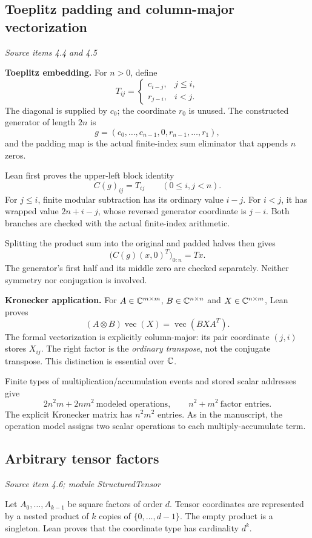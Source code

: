 \subsection{Toeplitz padding and column-major vectorization}\label{supp4:subsection:002}\textit{Source items 4.4 and 4.5}\par
\textbf{Toeplitz embedding.} For $n>0$, define
\[
T_{ij}=
\begin{cases}
c_{i-j},&j\le i,\\
r_{j-i},&i<j.
\end{cases}
\]
The diagonal is supplied by $c_0$; the coordinate $r_0$ is unused. The constructed generator of length $2n$ is
\[
g=(c_0,\ldots,c_{n-1},0,r_{n-1},\ldots,r_1),
\]
and the padding map is the actual finite-index sum eliminator that appends $n$ zeros.

Lean first proves the upper-left block identity
\[
C(g)_{ij}=T_{ij}\qquad(0\le i,j<n).
\]
For $j\le i$, finite modular subtraction has its ordinary value $i-j$. For $i<j$, it has wrapped value $2n+i-j$, whose reversed generator coordinate is $j-i$. Both branches are checked with the actual finite-index arithmetic.

Splitting the product sum into the original and padded halves then gives
\[
\boxed{\bigl(C(g)(x,0)^T\bigr)_{0:n}=Tx.}
\]
The generator's first half and its middle zero are checked separately. Neither symmetry nor conjugation is involved.

\textbf{Kronecker application.} For $A\in\C^{m\times m}$, $B\in\C^{n\times n}$ and $X\in\C^{n\times m}$, Lean proves
\[
\boxed{(A\otimes B)\operatorname{vec}(X)=\operatorname{vec}(BXA^T).}
\]
The formal vectorization is explicitly column-major: its pair coordinate $(j,i)$ stores $X_{ij}$. The right factor is the \emph{ordinary transpose}, not the conjugate transpose. This distinction is essential over $\C$.

Finite types of multiplication/accumulation events and stored scalar addresses give
\[
\boxed{2n^2m+2nm^2\ \text{modeled operations},\qquad n^2+m^2\ \text{factor entries}.}
\]
The explicit Kronecker matrix has $n^2m^2$ entries. As in the manuscript, the operation model assigns two scalar operations to each multiply-accumulate term.



\subsection{Arbitrary tensor factors}\label{supp4:subsection:003}\textit{Source item 4.6; module StructuredTensor}\par
Let $A_0,\ldots,A_{k-1}$ be square factors of order $d$. Tensor coordinates are represented by a nested product of $k$ copies of $\{0,\ldots,d-1\}$. The empty product is a singleton. Lean proves that the coordinate type has cardinality $d^k$.

